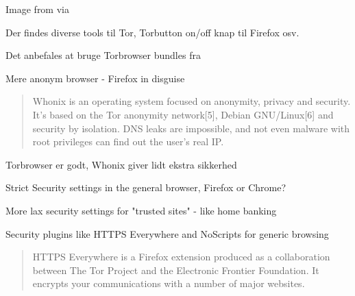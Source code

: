 \documentclass[20pt,landscape,a4paper,footrule]{foils}
\begin{document}
Image from  via



Der findes diverse tools til Tor, Torbutton on/off knap til Firefox osv.

Det anbefales at bruge Torbrowser bundles fra 



\centerline{\color{titlecolor} Mere anonym browser - Firefox in disguise}



\begin{quote}
Whonix is an operating system focused on anonymity, privacy and security. It's based on the Tor anonymity network[5], Debian GNU/Linux[6] and security by isolation. DNS leaks are impossible, and not even malware with root privileges can find out the user's real IP. 

\end{quote}

\centerline{Torbrowser er godt, Whonix giver lidt ekstra sikkerhed}




\begin{list2}
\item Strict Security settings in the general browser, Firefox or Chrome?
\item More lax security settings for "trusted sites" - like home banking
\item Security plugins like HTTPS Everywhere and NoScripts for generic browsing
\end{list2}


\begin{quote}
HTTPS Everywhere is a Firefox extension produced as a collaboration between The Tor Project and the Electronic Frontier Foundation. It encrypts your communications with a number of major websites.
\end{quote}
\end{document}
